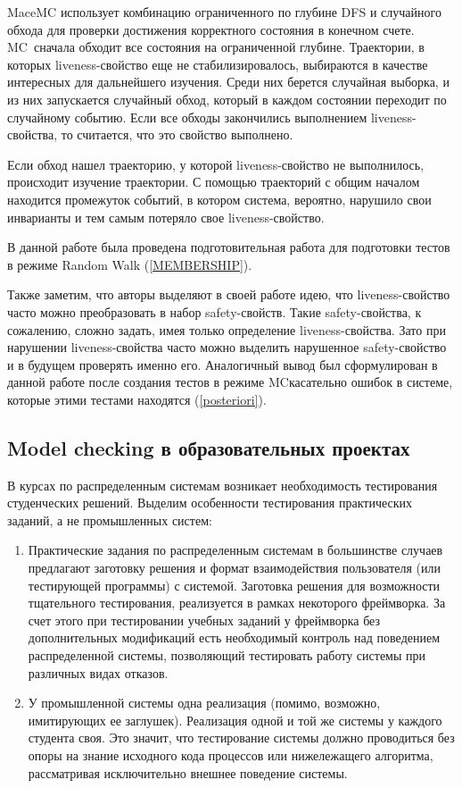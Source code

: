 \documentclass[a4paper,12pt]{extarticle}
\newcommand{\mc}[0]{MC}
\begin{document}
MaceMC использует комбинацию ограниченного по глубине DFS и случайного обхода для проверки достижения корректного состояния в конечном счете.
\mc\ сначала обходит все состояния на ограниченной глубине.
Траектории, в которых liveness-свойство еще не стабилизировалось, выбираются в качестве интересных для дальнейшего изучения.
Среди них берется случайная выборка, и из них запускается случайный обход, который в каждом состоянии переходит по случайному событию.
Если все обходы закончились выполнением liveness-свойства, то считается, что это свойство выполнено.

Если обход нашел траекторию, у которой liveness-свойство не выполнилось, происходит изучение траектории.
С помощью траекторий с общим началом находится промежуток событий, в котором система, вероятно, нарушило свои инварианты и тем самым потеряло свое liveness-свойство.

В данной работе была проведена подготовительная работа для подготовки тестов в режиме Random Walk (\cref{MEMBERSHIP}).

Также заметим, что авторы выделяют в своей работе идею, что liveness-свойство часто можно преобразовать в набор safety-свойств.
Такие safety-свойства, к сожалению, сложно задать, имея только определение liveness-свойства.
Зато при нарушении liveness-свойства часто можно выделить нарушенное safety-свойство и в будущем проверять именно его.
Аналогичный вывод был сформулирован в данной работе после создания тестов в режиме \mc касательно ошибок в системе, которые этими тестами находятся (\cref{posteriori}).




\subsection{Model checking в образовательных проектах}

В курсах по распределенным системам возникает необходимость тестирования студенческих решений.
Выделим особенности тестирования практических заданий, а не промышленных систем:
\begin{enumerate}
\item Практические задания по распределенным системам в большинстве случаев предлагают заготовку решения и формат взаимодействия пользователя (или тестирующей программы) с системой.
Заготовка решения для возможности тщательного тестирования, реализуется в рамках некоторого фреймворка.
За счет этого при тестировании учебных заданий у фреймворка без дополнительных модификаций есть необходимый контроль над поведением распределенной системы, позволяющий тестировать работу системы при различных видах отказов.
\item У промышленной системы одна реализация (помимо, возможно, имитирующих ее заглушек).
Реализация одной и той же системы у каждого студента своя.
Это значит, что тестирование системы должно проводиться без опоры на знание исходного кода процессов или нижележащего алгоритма, рассматривая исключительно внешнее поведение системы.  
\end{enumerate}
\end{document}
